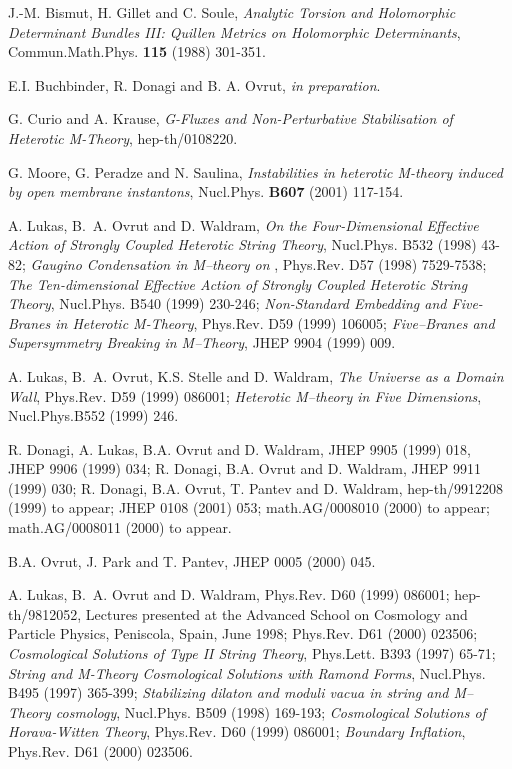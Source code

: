 \documentclass[a4paper,12pt]{article}
\numberwithin{equation}{section}
\theoremstyle{plain}
\begin{document}
\begin{thebibliography}{99}
 J.-M. Bismut, H. Gillet and C. Soule,
{\em Analytic Torsion and Holomorphic Determinant Bundles III: Quillen Metrics
on Holomorphic Determinants}, Commun.Math.Phys. {\bf
115 \rm} (1988) 301-351.

  E.I. Buchbinder, R. Donagi and B. A. Ovrut,
{\em in preparation}.

  G. Curio and A. Krause, {\em G-Fluxes and
Non-Perturbative Stabilisation of Heterotic M-Theory}, hep-th/0108220.

  G. Moore, G. Peradze and N. Saulina,
{\em Instabilities in heterotic M-theory induced by open membrane
instantons},
Nucl.Phys. {\bf B607} (2001) 117-154.

 A. Lukas, B.~A. Ovrut and D. Waldram, {\em On the
    Four-Dimensional Effective Action of Strongly Coupled Heterotic
    String Theory}, Nucl.Phys. B532 (1998) 43-82; {\em Gaugino
Condensation in M--theory on \coordHE{}}, Phys.Rev. D57 (1998) 7529-7538;
{\em The
    Ten-dimensional Effective Action of Strongly Coupled Heterotic String
Theory}, Nucl.Phys. B540 (1999) 230-246;
{\em Non-Standard Embedding and Five-Branes in
Heterotic M-Theory}, Phys.Rev. D59 (1999) 106005;
{\em Five--Branes and Supersymmetry Breaking in M--Theory}, JHEP 9904
(1999)
009.

 A. Lukas, B.~A. Ovrut, K.S. Stelle and D. Waldram,
               {\em The Universe as a Domain Wall}, Phys.Rev. D59 (1999)
               086001;  {\em Heterotic M--theory in Five Dimensions},
Nucl.Phys.B552 (1999) 246.

 R. Donagi, A. Lukas, B.A. Ovrut and D. Waldram, JHEP 9905
(1999) 018, JHEP 9906 (1999) 034; R. Donagi, B.A. Ovrut and D. Waldram,
JHEP 9911 (1999) 030; R. Donagi, B.A. Ovrut, T. Pantev and D. Waldram,
hep-th/9912208 (1999) to appear; JHEP 0108 (2001) 053; math.AG/0008010
(2000)
to appear; math.AG/0008011 (2000) to appear.

 B.A. Ovrut, J. Park and T. Pantev, JHEP 0005 (2000) 045.

  A. Lukas, B.~A. Ovrut and D. Waldram, Phys.Rev. D60 (1999)
        086001; hep-th/9812052, Lectures presented at the Advanced School
on Cosmology and Particle Physics, Peniscola, Spain, June 1998;
Phys.Rev. D61 (2000) 023506; {\em Cosmological Solutions of Type II String
Theory}, Phys.Lett. B393 (1997) 65-71; {\em String and M-Theory
Cosmological
Solutions with Ramond Forms}, Nucl.Phys. B495 (1997) 365-399;
{\em Stabilizing dilaton and moduli vacua in string and M--Theory
cosmology},
Nucl.Phys. B509 (1998) 169-193; {\em Cosmological Solutions of
Horava-Witten
Theory},  Phys.Rev. D60 (1999) 086001; {\em Boundary Inflation},
Phys.Rev.
D61 (2000) 023506.


\end{thebibliography}
\end{document}
